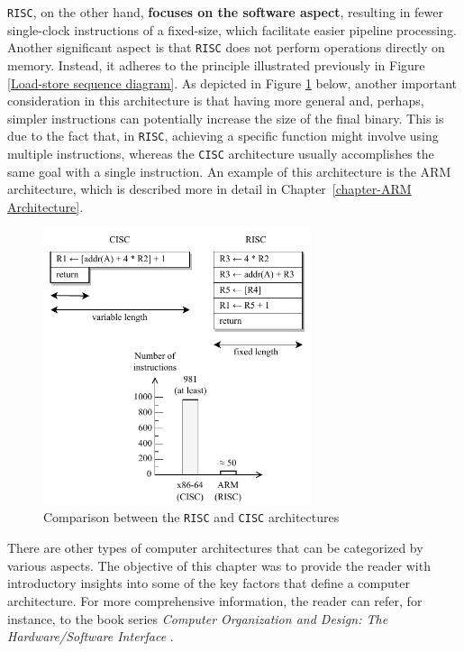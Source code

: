 \documentclass[english, ing, kiv, he, iso690numb, pdf]{fasthesis}
\begin{document}
	\texttt{RISC}, on the other hand, \textbf{focuses on the software aspect}, resulting in fewer single-clock instructions of a fixed-size, which facilitate easier pipeline processing. Another significant aspect is that \texttt{RISC} does not perform operations directly on memory. Instead, it adheres to the principle illustrated previously in Figure \ref{Load-store sequence diagram}. As depicted in Figure \ref{Comparison between the RISC and CISC architectures} below, another important consideration in this architecture is that having more general and, perhaps, simpler instructions can potentially increase the size of the final binary. This is due to the fact that, in \texttt{RISC}, achieving a specific function might involve using multiple instructions, whereas the \texttt{CISC} architecture usually accomplishes the same goal with a single instruction. An example of this architecture is the ARM architecture, which is described more in detail in Chapter~\ref{chapter-ARM Architecture}.
	
	\begin{figure}[ht]
		\centering
		\includegraphics[width=0.70\textwidth]{img/diagrams/risc_vs_cisc.pdf}
		\caption{Comparison between the \texttt{RISC} and \texttt{CISC} architectures \cite{x86-vs-ARM}}
		\label{Comparison between the RISC and CISC architectures}
	\end{figure}
	
	\begin{important}
		There are other types of computer architectures that can be categorized by various aspects. The objective of this chapter was to provide the reader with introductory insights into some of the key factors that define a computer architecture. For more comprehensive information, the reader can refer, for instance, to the book series \textit{Computer Organization and Design: The Hardware/Software Interface} \cite{computer-organization-and-design}.
	\end{important}
	
\end{document}
